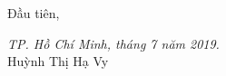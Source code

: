 Đầu tiên, \hfill
\begin{minipage}[H]{0.5\textwidth}
 \centering
 \textsl{TP. Hồ Chí Minh, tháng 7 năm 2019.}\\
 \vspace{1cm}
 Huỳnh Thị Hạ Vy 
\end{minipage}
